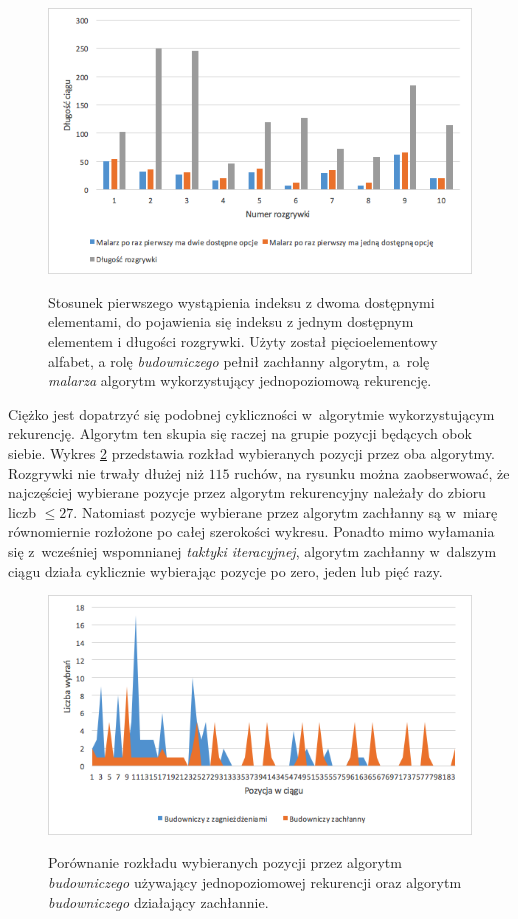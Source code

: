 \documentclass[document]{xmgr}
\begin{document}
\begin{figure}[tbh]
    \centering
    \caption{Stosunek pierwszego wystąpienia indeksu z dwoma dostępnymi elementami, do pojawienia się indeksu z jednym dostępnym elementem i długości rozgrywki. Użyty został pięcioelementowy alfabet, a rolę \emph{budowniczego} pełnił zachłanny algorytm, a~rolę \emph{malarza} algorytm wykorzystujący jednopoziomową rekurencję.}
    \includegraphics[width = \textwidth]{images2/builder0efficiency}
    \label{fig:builder0Efficiency}
\end{figure}

Ciężko jest dopatrzyć się podobnej cykliczności w~algorytmie wykorzystującym rekurencję. Algorytm ten skupia się raczej na grupie pozycji będących obok siebie. Wykres \ref{fig:buildersPickedIndexes} przedstawia rozkład wybieranych pozycji przez oba algorytmy. Rozgrywki nie trwały dłużej niż $115$ ruchów, na rysunku można zaobserwować, że najczęściej wybierane pozycje przez algorytm rekurencyjny należały do zbioru liczb $\leq 27$. Natomiast pozycje wybierane przez algorytm zachłanny są w~miarę równomiernie rozłożone po całej szerokości wykresu. Ponadto mimo wyłamania się z~wcześniej wspomnianej \emph{taktyki iteracyjnej}, algorytm zachłanny w~dalszym ciągu działa cyklicznie wybierając pozycje po zero, jeden lub pięć razy.

\begin{figure}[tbh]
    \centering
    \caption{Porównanie rozkładu wybieranych pozycji przez algorytm \emph{budowniczego} używający jednopoziomowej rekurencji oraz algorytm \emph{budowniczego} działający zachłannie.}
    \includegraphics[width = \textwidth]{images2/buildersPickedIndexes}
    \label{fig:buildersPickedIndexes}
\end{figure}
\end{document}
